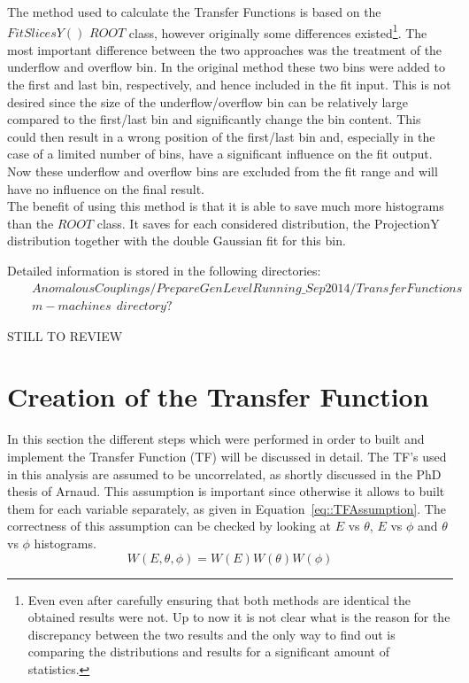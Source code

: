 The method used to calculate the Transfer Functions is based on the $FitSlicesY()$ $ROOT$ class, however originally some differences existed\footnote{Even even after carefully ensuring that both methods are identical the obtained results were not. Up to now it is not clear what is the reason for the discrepancy between the two results and the only way to find out is comparing the distributions and results for a significant amount of statistics.}.
The most important difference between the two approaches was the treatment of the underflow and overflow bin. In the original method these two bins were added to the first and last bin, respectively, and hence included in the fit input. This is not desired since the size of the underflow/overflow bin can be relatively large compared to the first/last bin and significantly change the bin content. This could then result in a wrong position of the first/last bin and, especially in the case of a limited number of bins, have a significant influence on the fit output.
Now these underflow and overflow bins are excluded from the fit range and will have no influence on the final result.\\
The benefit of using this method is that it is able to save much more histograms than the $ROOT$ class. It saves for each considered distribution, the ProjectionY distribution together with the double Gaussian fit for this bin. 

Detailed information is stored in the following directories:
\begin{eqnarray*}
 & & AnomalousCouplings/PrepareGenLevelRunning\_Sep2014/TransferFunctions \\
 & & m-machines ~~ directory?
\end{eqnarray*}

STILL TO REVIEW
\section{Creation of the Transfer Function}
In this section the different steps which were performed in order to built and implement the Transfer Function (TF) will be discussed in detail. The TF's used in this analysis are assumed to be uncorrelated, as shortly discussed in the PhD thesis of Arnaud. This assumption is important since otherwise it allows to built them for each variable separately, as given in Equation~\ref{eq::TFAssumption}. The correctness of this assumption can be checked by looking at $E$ vs $\theta$, $E$ vs $\phi$ and $\theta$ vs $\phi$ histograms.
\begin{equation} \label{eq::TFAssumption}
 W(E, \theta, \phi) = W(E) W(\theta) W(\phi)
\end{equation}

